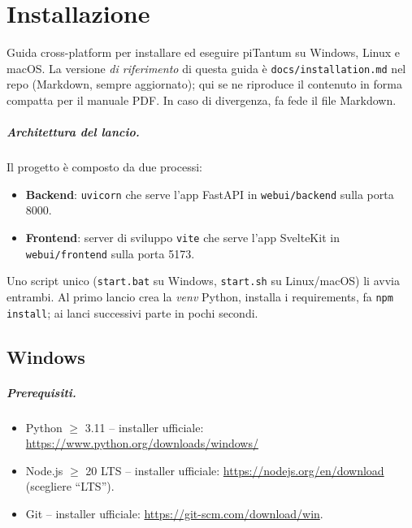 \chapter{Installazione}
\label{ch:installazione}

Guida cross-platform per installare ed eseguire piTantum su Windows,
Linux e macOS. La versione \emph{di riferimento} di questa guida \`e
\texttt{docs/installation.md} nel repo (Markdown, sempre aggiornato);
qui se ne riproduce il contenuto in forma compatta per il manuale
PDF. In caso di divergenza, fa fede il file Markdown.

\paragraph{Architettura del lancio.} Il progetto \`e composto da due
processi:
\begin{itemize}
  \item \textbf{Backend}: \texttt{uvicorn} che serve l'app FastAPI in
        \texttt{webui/backend} sulla porta 8000.
  \item \textbf{Frontend}: server di sviluppo \texttt{vite} che serve
        l'app SvelteKit in \texttt{webui/frontend} sulla porta 5173.
\end{itemize}
Uno script unico (\texttt{start.bat} su Windows,
\texttt{start.sh} su Linux/macOS) li avvia entrambi. Al primo lancio
crea la \emph{venv} Python, installa i requirements, fa
\texttt{npm install}; ai lanci successivi parte in pochi secondi.

\section{Windows}

\paragraph{Prerequisiti.}
\begin{itemize}
  \item Python $\geq$ 3.11 -- installer ufficiale:
        \url{https://www.python.org/downloads/windows/}
  \item Node.js $\geq$ 20 LTS -- installer ufficiale:
        \url{https://nodejs.org/en/download} (scegliere ``LTS'').
  \item Git -- installer ufficiale:
        \url{https://git-scm.com/download/win}.
\end{itemize}

